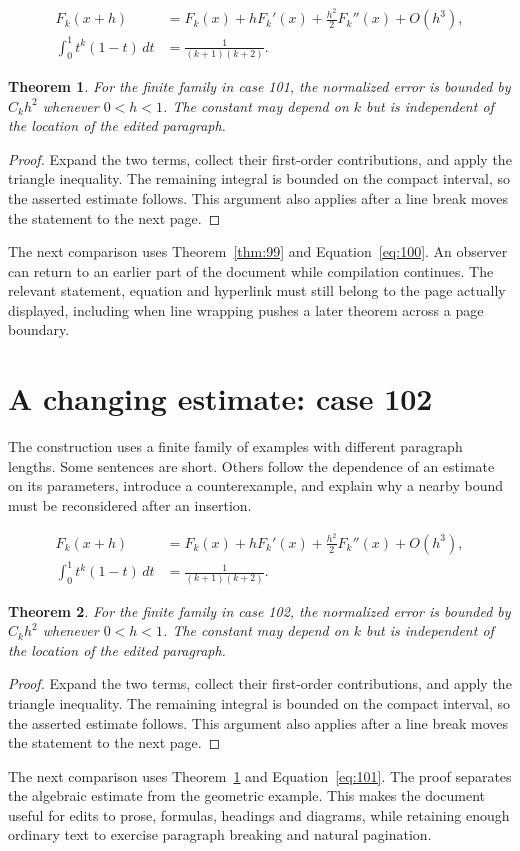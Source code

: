 \documentclass[a4paper,10pt]{article}
\newtheorem{theorem}{Theorem}[section]
\begin{document}
\lipsum[1-2]
\begin{align}\label{eq:100}
 F_k(x+h)&=F_k(x)+hF_k'(x)+\frac{h^2}{2}F_k''(x)+O(h^3),\\
 \int_0^1 t^k(1-t)\,dt&=\frac{1}{(k+1)(k+2)}.
\end{align}
\begin{theorem}\label{thm:100}
For the finite family in case 101, the normalized error is bounded by $C_k h^2$ whenever $0<h<1$. The constant may depend on $k$ but is independent of the location of the edited paragraph.
\end{theorem}
\begin{proof}
Expand the two terms, collect their first-order contributions, and apply the
triangle inequality. The remaining integral is bounded on the compact interval,
so the asserted estimate follows. This argument also applies after a line break
moves the statement to the next page.
\end{proof}
The next comparison uses Theorem~\ref{thm:99} and Equation~\ref{eq:100}. An observer can return to an earlier part of the document while compilation continues. The relevant statement, equation and hyperlink must still belong to the page actually displayed, including when line wrapping pushes a later theorem across a page boundary.

\lipsum[3]

\section{A changing estimate: case 102}\label{unit:101}
The construction uses a finite family of examples with different paragraph lengths. Some sentences are short. Others follow the dependence of an estimate on its parameters, introduce a counterexample, and explain why a nearby bound must be reconsidered after an insertion.

\lipsum[4-5]
\begin{align}\label{eq:101}
 F_k(x+h)&=F_k(x)+hF_k'(x)+\frac{h^2}{2}F_k''(x)+O(h^3),\\
 \int_0^1 t^k(1-t)\,dt&=\frac{1}{(k+1)(k+2)}.
\end{align}
\begin{theorem}\label{thm:101}
For the finite family in case 102, the normalized error is bounded by $C_k h^2$ whenever $0<h<1$. The constant may depend on $k$ but is independent of the location of the edited paragraph.
\end{theorem}
\begin{proof}
Expand the two terms, collect their first-order contributions, and apply the
triangle inequality. The remaining integral is bounded on the compact interval,
so the asserted estimate follows. This argument also applies after a line break
moves the statement to the next page.
\end{proof}
The next comparison uses Theorem~\ref{thm:100} and Equation~\ref{eq:101}. The proof separates the algebraic estimate from the geometric example. This makes the document useful for edits to prose, formulas, headings and diagrams, while retaining enough ordinary text to exercise paragraph breaking and natural pagination.
\end{document}
